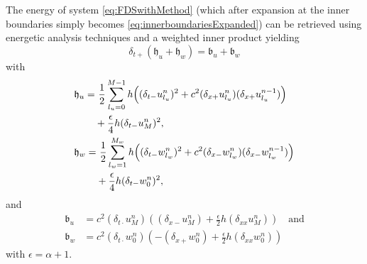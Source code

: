 The energy of system \eqref{eq:FDSwithMethod} (which after expansion at the inner boundaries simply becomes \eqref{eq:innerboundariesExpanded}) can be retrieved using energetic analysis techniques \cite{bilbao2009} and a weighted inner product yielding
\begin{equation}
    \delta_{t+}\left(\mathfrak{h}_u + \mathfrak{h}_w\right) = \mathfrak{b}_u + \mathfrak{b}_w
\end{equation}
with 
\begin{align}
&\begin{aligned}
    \mathfrak{h}_u =&\  \frac{1}{2}\sum_{{l_u}=0}^{M-1}h\Big((\delta_{t-}u_{l_u}^n)^2 + c^2 (\delta_{x+}u_{l_u}^n)(\delta_{x+}u_{l_u}^{n-1})\Big) \\
    &+ \frac{\epsilon}{4}h(\delta_{t-}u_M^n)^2,
\end{aligned}
\\
&\begin{aligned}
    \mathfrak{h}_w=&\ \frac{1}{2}\sum_{{l_w}=1}^{M_w} h\Big((\delta_{t-}w_{l_w}^n)^2+c^2(\delta_{x-}w_{l_w}^n)(\delta_{x-}w_{l_w}^{n-1}) \Big)\\
    &+ \frac{\epsilon}{4}h(\delta_{t-}w_0^n)^2,
    \end{aligned}
\end{align}
and 
\begin{equation}\label{eq:boundaryTerms}
    \begin{aligned}
    \mathfrak{b}_u &= c^2(\delta_{t\cdot}u_M^n)\left((\delta_{x-}u_M^n)+\frac{\epsilon}{2}h(\delta_{xx}u_M^n)\right) \quad \text{and}\\
    \mathfrak{b}_w &= c^2(\delta_{t\cdot}w_0^n)\left(-(\delta_{x+}w_0^n)+\frac{\epsilon}{2}h(\delta_{xx}w_0^n)\right)
    \end{aligned}
\end{equation}
with $\epsilon = \alpha + 1$. \SWcomment[When $\alpha = 0$, $u_M^n = w_0^n$ and the boundary terms vanish. When $\alpha \rightarrow 1$ the boundary terms reduce to 
\begin{equation}
    \mathfrak{b}_u+\mathfrak{b}_w = -\frac{c^2}{2}\delta_{t+}\big(h(\delta_{x+}u_M^n)(\delta_{x+}u_M^{n-1})\big),  
\end{equation}
which is essentially the potential energy between the inner boundaries. See Appendix B.4 (p. 17) in \url{https://www.overleaf.com/project/5eec78b95071c2000121fff4} for a derivation.]
